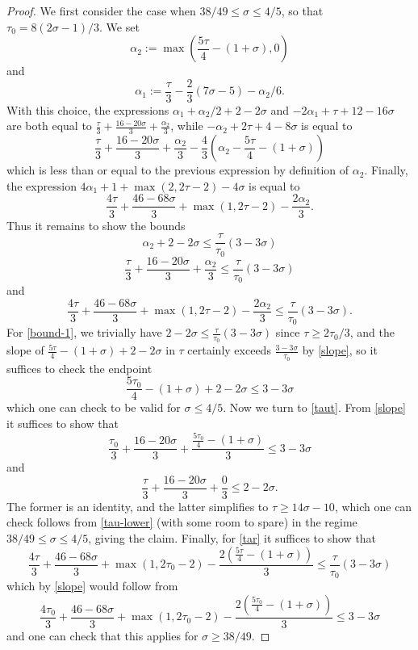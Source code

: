 \documentclass[a4paper, 10pt]{amsart}
\begin{document}
\begin{proof}
    We first consider the case when $38/49 \leq \sigma \leq 4/5$, so that $\tau_0 = 8(2\sigma-1)/3$.
    We set
    $$ \alpha_2 := \max\left( \frac{5\tau}{4} - (1+\sigma), 0\right)$$
    and
    $$ \alpha_1 := \frac{\tau}{3} - \frac{2}{3} (7\sigma-5) - \alpha_2/6.$$
    With this choice, the expressions $\alpha_1+\alpha_2/2 + 2-2\sigma$ and $-2\alpha_1 + \tau + 12 - 16 \sigma$ are both equal to
    $\frac{\tau}{3} + \frac{16-20\sigma}{3} + \frac{\alpha_2}{3}$, while $-\alpha_2 + 2\tau+4-8\sigma$ is equal to
    $$ \frac{\tau}{3} + \frac{16-20\sigma}{3} + \frac{\alpha_2}{3} - \frac{4}{3} \left(\alpha_2 - \frac{5\tau}{4} - (1+\sigma)\right)$$
    which is less than or equal to the previous expression by definition of $\alpha_2$.  Finally, the expression
    $4\alpha_1 + 1+\max(2,2\tau-2)-4\sigma$ is equal to
    $$ \frac{4\tau}{3} + \frac{46-68\sigma}{3} + \max(1,2\tau-2) - \frac{2\alpha_2}{3}.$$
    Thus it remains to show the bounds
    \begin{equation}\label{bound-1}
     \alpha_2 + 2 - 2 \sigma \leq \frac{\tau}{\tau_0} (3-3\sigma)
    \end{equation}
    \begin{equation}\label{taut}
        \frac{\tau}{3} + \frac{16-20\sigma}{3} + \frac{\alpha_2}{3} \leq \frac{\tau}{\tau_0} (3-3\sigma)
    \end{equation}
    and
    \begin{equation}\label{tar}
        \frac{4\tau}{3} + \frac{46-68\sigma}{3}+ \max(1,2\tau-2) - \frac{2\alpha_2}{3} \leq \frac{\tau}{\tau_0} (3-3\sigma).
    \end{equation}
    For \eqref{bound-1}, we trivially have $2-2\sigma \leq \frac{\tau}{\tau_0}(3-3\sigma)$ since $\tau \geq 2\tau_0/3$, and the slope of $\frac{5\tau}{4} - (1+\sigma) + 2-2\sigma$ in $\tau$ certainly exceeds $\frac{3-3\sigma}{\tau_0}$ by \eqref{slope}, so it suffices to check the endpoint
    $$ \frac{5\tau_0}{4} - (1+\sigma) + 2-2\sigma \leq 3-3\sigma$$
    which one can check to be valid for $\sigma \leq 4/5$. Now we turn to \eqref{taut}.  From \eqref{slope} it suffices to show that
    $$ \frac{\tau_0}{3} + \frac{16-20\sigma}{3} + \frac{\frac{5\tau_0}{4} - (1+\sigma)}{3} \leq 3 -3 \sigma$$
    and
    $$ \frac{\tau}{3} + \frac{16-20\sigma}{3} + \frac{0}{3} \leq 2 -2 \sigma.$$
    The former is an identity, and the latter simplifies to $\tau \geq 14\sigma-10$, which one can check follows from \eqref{tau-lower} (with some room to spare) in the regime $38/49 \leq \sigma \leq 4/5$, giving the claim.  Finally, for \eqref{tar} it suffices to show that
    $$ \frac{4\tau}{3} + \frac{46-68\sigma}{3}  + \max(1,2\tau_0-2) - \frac{2(\frac{5\tau}{4} - (1+\sigma))}{3} \leq \frac{\tau}{\tau_0} (3-3\sigma)$$
    which by \eqref{slope} would follow from
    $$ \frac{4\tau_0}{3} + \frac{46-68\sigma}{3} + \max(1,2\tau_0-2) - \frac{2(\frac{5\tau_0}{4} - (1+\sigma))}{3} \leq 3-3\sigma$$
    and one can check that this applies for $\sigma \geq 38/49$.


\end{proof}
\end{document}
